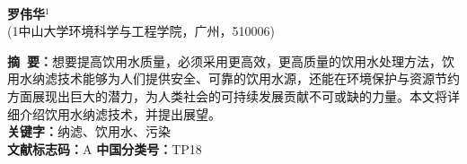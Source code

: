 \documentclass[a4paper,onecolumn,twoside]{article}
\begin{document}
  

    \thispagestyle{plain}
             \vspace{-3em}
            \begin{center}
              \parbox{\textwidth}{
                \begin{center}
                  {}\\
                \vspace{3pt}
                  \vspace{-0.0cm}
                \end{center}
                \begin{center}
                  \textbf{罗伟华$^1$}\\[2pt]
                  \small{(1中山大学环境科学与工程学院，广州，510006)}\\[2pt]
                \end{center}
                {\small{\textbf{摘~要：}想要提高饮用水质量，必须采用更高效，更高质量的饮用水处理方法，饮用水纳滤技术能够为人们提供安全、可靠的饮用水源，还能在环境保护与资源节约方面展现出巨大的潜力，为人类社会的可持续发展贡献不可或缺的力量。本文将详细介绍饮用水纳滤技术，并提出展望。
                \\
                \textbf{关键字：}纳滤、饮用水、污染\\
                \textbf{文献标志码：}A \hspace{4cm} \textbf{中国分类号：}TP18
              }}

              }
            \end{center}
\end{document}
